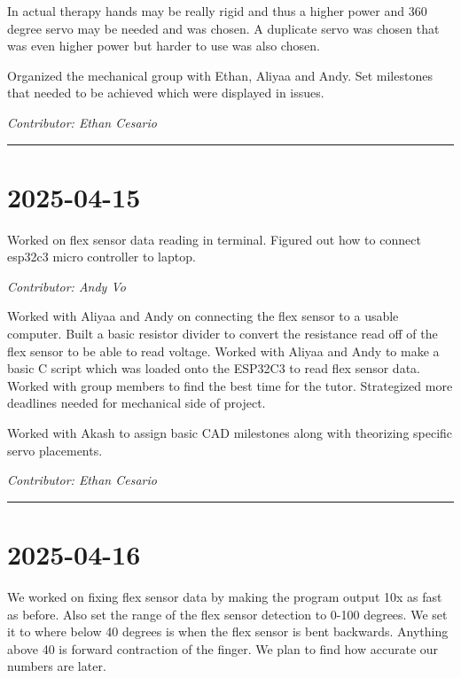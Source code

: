 \documentclass[12pt]{article}
\begin{document}
In actual therapy hands may be really rigid and thus a higher power and 360 degree servo may be needed and was chosen. A duplicate servo was chosen that was even higher power but harder to use was also chosen.


Organized the mechanical group with Ethan, Aliyaa and Andy. Set milestones that needed to be achieved which were displayed in issues.


\vspace{1em}
\noindent\textit{Contributor: Ethan Cesario}
\vspace{1em}
\hrule




\section*{2025-04-15}
Worked on flex sensor data reading in terminal. Figured out how to connect esp32c3 micro controller to laptop.




\vspace{1em}
\noindent\textit{Contributor: Andy Vo}
\vspace{1em}


Worked with Aliyaa and Andy on connecting the flex sensor to a usable computer. Built a basic resistor divider to convert the resistance read off of the flex sensor to be able to read voltage. Worked with Aliyaa and Andy to make a basic C script which was loaded onto the ESP32C3 to read flex sensor data. Worked with group members to find the best time for the tutor. Strategized more deadlines needed for mechanical side of project.


Worked with Akash to assign basic CAD milestones along with theorizing specific servo placements.


\vspace{1em}
\noindent\textit{Contributor: Ethan Cesario}
\vspace{1em}


\hrule


\section*{2025-04-16}
We worked on fixing flex sensor data by making the program output 10x as fast as before. Also set the range of the flex sensor detection to 0-100 degrees. We set it to where below 40 degrees is when the flex sensor is bent backwards. Anything above 40 is forward contraction of the finger. We plan to find how accurate our numbers are later.
\end{document}
